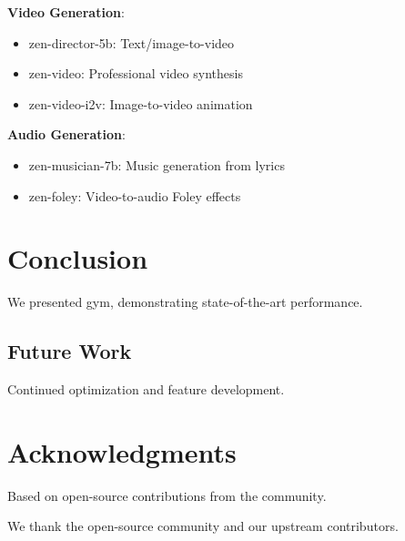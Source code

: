 \documentclass[11pt,a4paper]{article}
\begin{document}
\textbf{Video Generation}:
\begin{itemize}
    \item zen-director-5b: Text/image-to-video
    \item zen-video: Professional video synthesis
    \item zen-video-i2v: Image-to-video animation
\end{itemize}

\textbf{Audio Generation}:
\begin{itemize}
    \item zen-musician-7b: Music generation from lyrics
    \item zen-foley: Video-to-audio Foley effects
\end{itemize}

\section{Conclusion}

We presented gym, demonstrating state-of-the-art performance.

\subsection{Future Work}
Continued optimization and feature development.

\section*{Acknowledgments}

Based on open-source contributions from the community.

We thank the open-source community and our upstream contributors.



\end{document}
